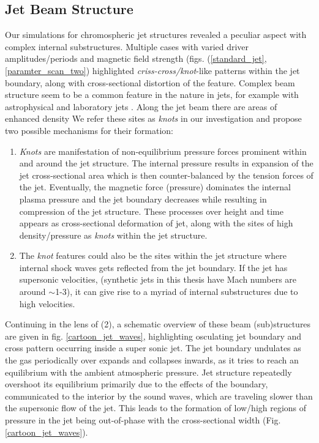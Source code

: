 \documentclass[12pt]{ociamthesis}
\newcommand{\np}{\\ \\}
\begin{document}
\subsection{Jet Beam Structure}
\label{subsec:j_beam_struc}
Our simulations for chromospheric jet structures revealed a peculiar aspect with complex internal substructures. Multiple cases with varied driver amplitudes/periods and magnetic field strength (figs. (\ref{standard_jet}, \ref{paramter_scan_two}) highlighted \textit{criss-cross/knot}-like patterns within the jet boundary, along with cross-sectional distortion of the feature. Complex beam structure seem to be a common feature in the nature in jets, for example with astrophysical \citep{van_Putten_1996ApJ467L57V, DeGouveiaDalPino2005, Hada2013ApJ77570H, Cohen2014ApJ787151C, Hervet2017AnA606A103H} and laboratory jets \citep{Menon2010, Edgington-Mitchell2014, Ono2014}. Along the jet beam there are areas of enhanced density We refer these sites as \textit{knots} in our investigation and propose two possible mechanisms for their formation:
\begin{enumerate}
\item{\textit{Knots} are manifestation of non-equilibrium pressure forces prominent within and around the jet structure. The internal pressure results in expansion of the jet cross-sectional area which is then counter-balanced by the tension forces of the jet. Eventually, the magnetic force (pressure) dominates the internal plasma pressure and the jet boundary decreases while resulting in compression of the jet structure. These processes over height and time appears as cross-sectional deformation of jet, along with the sites of high density/pressure as \textit{knots} within the jet structure.}
\item{The \textit{knot} features could also be the sites within the jet structure where internal shock waves \citep{Norman1982} gets reflected from the jet boundary. If the jet has supersonic velocities,  (synthetic jets in this thesis have Mach numbers are around $\sim$1-3), it can give rise to a myriad of internal substructures due to high velocities.}
\end{enumerate}
Continuing in the lens of (2), a schematic overview of these beam (sub)structures are given in fig. \ref{cartoon_jet_waves}, highlighting osculating jet boundary and cross pattern occurring inside a super sonic jet. The jet boundary undulates as the gas periodically over expands and collapses inwards, as it tries to reach an equilibrium with the ambient atmospheric pressure. Jet structure repeatedly overshoot its equilibrium primarily due to the effects of the boundary, communicated to the interior by the sound waves, which are traveling slower than the supersonic flow of the jet. This leads to the formation of low/high regions of pressure in the jet being out-of-phase with the cross-sectional width (Fig. \ref{cartoon_jet_waves}). \np 
\end{document}
